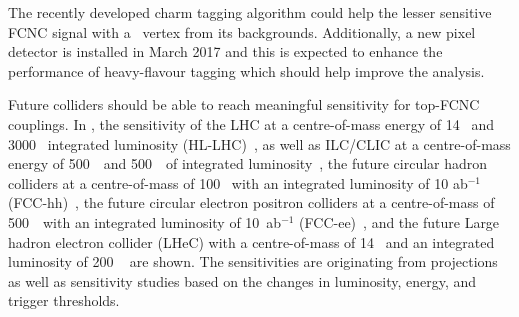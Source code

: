 The recently developed charm tagging algorithm could help the lesser sensitive FCNC signal with a \Zct\ vertex from its backgrounds. Additionally, a new pixel detector is installed in March 2017 and this is expected to enhance the performance of heavy-flavour tagging which should help improve the analysis. 

\newpage
Future colliders should be able to reach meaningful sensitivity for top-FCNC couplings. In , the sensitivity of the LHC at a centre-of-mass energy of 14 \TeV\ and 3000 \fbinv\ integrated luminosity (HL-LHC)~\cite{Agashe:2013hma}, as well as ILC/CLIC at a centre-of-mass energy of 500~\GeV\ and 500~\fbinv\ of integrated luminosity~\cite{Mangano:2016jyj}, the  future circular hadron colliders at a centre-of-mass of 100 \TeV\ with an integrated luminosity of 10 ab$^{-1}$ (FCC-hh)~\cite{Agashe:2013hma}, the future circular electron positron colliders at a centre-of-mass of 500~\GeV\ with an integrated luminosity of 10~ab$^{-1}$ (FCC-ee)~\cite{Khanpour:2014xla}, and the future Large hadron electron collider (LHeC) with a centre-of-mass of 14 \TeV\ and an integrated luminosity of 200 \fbinv~\cite{Liu:2015kkp} are shown. The sensitivities are originating from projections as well as sensitivity studies based on the changes in luminosity, energy, and trigger thresholds. 

